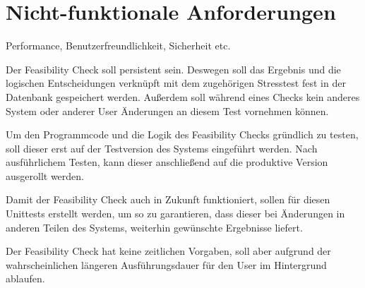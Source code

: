 \section{Nicht-funktionale Anforderungen}
Performance, Benutzerfreundlichkeit, Sicherheit etc.


Der Feasibility Check soll persistent sein. Deswegen soll das Ergebnis und die logischen Entscheidungen verknüpft mit dem zugehörigen Stresstest fest in der Datenbank gespeichert werden. Außerdem soll während eines Checks kein anderes System oder anderer User Änderungen an diesem Test vornehmen können.

Um den Programmcode und die Logik des Feasibility Checks gründlich zu testen, soll dieser erst auf der Testversion des Systems eingeführt werden. Nach ausführlichem Testen, kann dieser anschließend auf die produktive Version ausgerollt werden.

Damit der Feasibility Check auch in Zukunft funktioniert, sollen für diesen Unittests erstellt werden, um so zu garantieren, dass dieser bei Änderungen in anderen Teilen des Systems, weiterhin gewünschte Ergebnisse liefert.

Der Feasibility Check hat keine zeitlichen Vorgaben, soll aber aufgrund der wahrscheinlichen längeren Ausführungsdauer für den User im Hintergrund ablaufen.
